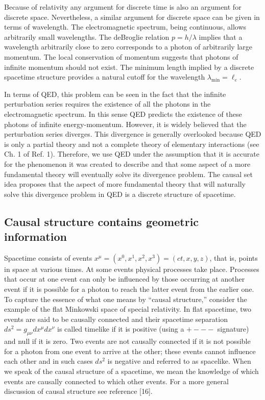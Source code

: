 Because of relativity any argument for discrete time is also an argument for
discrete space. Nevertheless, a similar argument for discrete space can be
given in terms of wavelength. The electromagnetic spectrum, being
continuous, allows arbitrarily small wavelengths. The deBroglie relation $%
p=h/\lambda $ implies that a wavelength arbitrarily close to zero
corresponds to a photon of arbitrarily large momentum. The local
conservation of momentum suggests that photons of infinite momentum should
not exist. The minimum length implied by a discrete spacetime structure
provides a natural cutoff for the wavelength $\lambda _{\min }=\ell _e$.

In terms of QED, this problem can be seen in the fact that the infinite
perturbation series requires the existence of all the photons in the
electromagnetic spectrum. In this sense QED predicts the existence of these
photons of infinite energy-momentum. However, it is widely believed that the
perturbation series diverges. This divergence is generally overlooked
because QED is only a partial theory and not a complete theory of elementary
interactions (see Ch. 1 of Ref. 1). Therefore, we use QED under the
assumption that it is accurate for the phenomenon it was created to describe
and that some aspect of a more fundamental theory will eventually solve its
divergence problem. The causal set idea proposes that the aspect of more
fundamental theory that will naturally solve this divergence problem in QED
is a discrete structure of spacetime.

\subsection{Causal structure contains geometric information}

Spacetime consists of events $x^{\mu {}}=(x^0,x^1,x^2,x^3)=(ct,x,y,z)$, that
is, points in space at various times. At some events physical processes take
place. Processes that occur at one event can only be influenced by those
occurring at another event if it is possible for a photon to reach the
latter event from the earlier one. To capture the essence of what one means
by ``causal structure,'' consider the example of the flat Minkowski space of
special relativity. In flat spacetime, two events are said to be causally
connected and their spacetime separation $ds^2=g_{\mu \nu }dx^{\mu
{}}dx^{\nu {}}$ is called timelike if it is positive (using a $+---$
signature) and null if it is zero. Two events are not causally connected if
it is not possible for a photon from one event to arrive at the other; these
events cannot influence each other and in such cases $ds^2$ is negative and
referred to as spacelike. When we speak of the causal structure of a
spacetime, we mean the knowledge of which events are causally connected to
which other events. For a more general discussion of causal structure see
reference [16].

